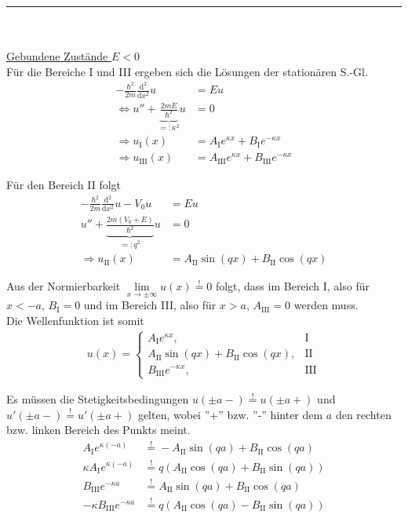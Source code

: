 \documentclass{article}
\newcommand{\diff}{\mathrm{d}}
\begin{document}
{\color{violet}
\hrule
{}\\
\\
\underline{Gebundene Zustände $E<0$}\\
Für die Bereiche I und III ergeben sich die Lösungen der stationären S.-Gl.
	\begin{align*}
		-\frac{\hbar^2}{2m}\frac{\diff^2}{\diff x^2}u &= Eu \\
		\Leftrightarrow u'' + \underbrace{\frac{2mE}{\hbar^2}}_{=:\kappa^2}u &= 0 \\
		\Rightarrow u_\text{I}(x) &= A_\text{I} e^{\kappa x} + B_\text{I} e^{-\kappa x} \\
		\Rightarrow u_\text{III}(x) &= A_\text{III}e^{\kappa x} + B_\text{III}e^{-\kappa x}
	\end{align*}

Für den Bereich II folgt
	\begin{align*}
		-\frac{\hbar^2}{2m}\frac{\diff^2}{\diff x^2}u - V_0 u &= E u \\
		u'' + \underbrace{\frac{2m(V_0 + E)}{\hbar^2}}_{=:q^2} u &= 0 \\
		\Rightarrow u_\text{II}(x) &= A_\text{II}\sin(qx) + B_\text{II}\cos(qx)
	\end{align*}

Aus der Normierbarkeit $\lim\limits_{x\rightarrow\pm\infty} u(x) \stackrel{!}{=} 0$ folgt, dass im Bereich I, also für $x<-a$, $B_\text{I}=0$ und im Bereich III, also für $x>a$, $A_\text{III}=0$ werden muss.\\
Die Wellenfunktion ist somit
	\begin{align*}
		u(x) = 
			\begin{cases}
				A_\text{I}e^{\kappa x}, & \text{I}\\
				A_\text{II}\sin(qx) + B_\text{II}\cos(qx), & \text{II}\\
				B_\text{III}e^{-\kappa x}, & \text{III}
			\end{cases}
	\end{align*}

Es müssen die Stetigkeitsbedingungen $u(\pm a-) \stackrel{!}{=} u(\pm a+)$ und $u'(\pm a-) \stackrel{!}{=} u'(\pm a+)$ gelten, wobei ''+'' bzw. ''-'' hinter dem $a$ den rechten bzw. linken Bereich des Punkts meint.
	\begin{align*}
		A_\text{I} e^{\kappa(-a)} &\stackrel{!}{=} -A_\text{II}\sin(qa) + B_\text{II}\cos(qa) \\
		\kappa A_\text{I}e^{\kappa(-a)} &\stackrel{!}{=} q(A_\text{II}\cos(qa) + B_\text{II}\sin(qa)) \\
		B_\text{III} e^{-\kappa a} &\stackrel{!}{=} A_\text{II}\sin(qa) + B_\text{II}\cos(qa) \\
		-\kappa B_\text{III} e^{-\kappa a} &\stackrel{!}{=} q(A_\text{II}\cos(qa) - B_\text{II}\sin(qa))
	\end{align*}

}
\end{document}
